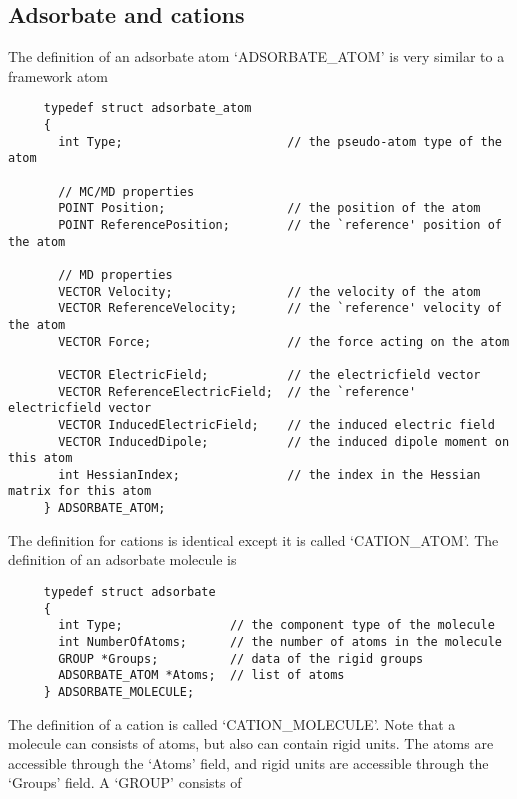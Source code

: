 \subsection*{Adsorbate and cations}
The definition of an adsorbate atom `ADSORBATE\_ATOM' is very similar to a framework atom
\begin{footnotesize}
\begin{verbatim}
     typedef struct adsorbate_atom
     {
       int Type;                       // the pseudo-atom type of the atom

       // MC/MD properties
       POINT Position;                 // the position of the atom
       POINT ReferencePosition;        // the `reference' position of the atom

       // MD properties
       VECTOR Velocity;                // the velocity of the atom
       VECTOR ReferenceVelocity;       // the `reference' velocity of the atom
       VECTOR Force;                   // the force acting on the atom

       VECTOR ElectricField;           // the electricfield vector
       VECTOR ReferenceElectricField;  // the `reference' electricfield vector
       VECTOR InducedElectricField;    // the induced electric field
       VECTOR InducedDipole;           // the induced dipole moment on this atom
       int HessianIndex;               // the index in the Hessian matrix for this atom
     } ADSORBATE_ATOM;
\end{verbatim}
\end{footnotesize}
The definition for cations is identical except it is called `CATION\_ATOM'.
The definition of an adsorbate molecule is
\begin{footnotesize}
\begin{verbatim}
     typedef struct adsorbate
     {
       int Type;               // the component type of the molecule
       int NumberOfAtoms;      // the number of atoms in the molecule
       GROUP *Groups;          // data of the rigid groups
       ADSORBATE_ATOM *Atoms;  // list of atoms
     } ADSORBATE_MOLECULE;
\end{verbatim}
\end{footnotesize}
The definition of a cation is called `CATION\_MOLECULE'.
Note that a molecule can consists of atoms, but also can contain rigid units. The atoms are accessible through the `Atoms' field, and rigid units
are accessible through the `Groups' field. A `GROUP' consists of
